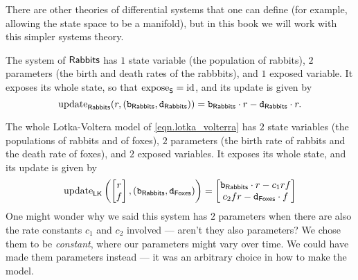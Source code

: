 \documentclass[DynamicalBook]{subfiles}
\begin{document}
\begin{remark}
  There are other theories of differential systems that one can define (for
  example, allowing the state space to be a manifold), but in this book we will
  work with this simpler systems theory.
\end{remark}

\begin{example}\label{ex:lotka.volterra.model}
  The system of $\mathsf{Rabbits}$ has $1$ state variable (the population of
  rabbits), $2$ parameters (the birth and death rates of the rabbbits), and $1$ exposed
  variable. It exposes its whole state, so that $\mathrm{expose}_{\mathsf{S}} = \mathrm{id}$, and its
  update is given by
  \[
\mathrm{update}_{\mathsf{\mathsf{Rabbits}}}( {r, (\mathtt{b}_{\mathsf{Rabbits}}, \mathtt{d}_{\mathsf{Rabbits}})} )
= \mathtt{b}_{\mathsf{Rabbits}} \cdot r - \mathtt{d}_{\mathsf{Rabbits}} \cdot r.
\]

  The whole Lotka-Voltera model of \cref{eqn.lotka_volterra} has $2$ state
  variables (the populations of rabbits and of foxes), $2$ parameters (the birth rate of rabbits and the death rate of foxes), and $2$ exposed
  variables. It exposes its whole state, and its update is given by
  \[
\mathrm{update}_{\mathsf{LK}}\left(  \begin{bmatrix}r \\ f \end{bmatrix}, (\mathtt{b}_{\mathsf{Rabbits}}, \mathtt{d}_{\mathsf{Foxes}})\right)
= \begin{bmatrix} \mathtt{b}_{\mathsf{Rabbits}} \cdot r -  c_1 r f \\ c_2 f r -
  \mathtt{d}_{\mathsf{Foxes}} \cdot f \end{bmatrix}
  \]
  One might wonder why we said this system has $2$ parameters when there are
  also the rate constants $c_1$ and $c_2$ involved --- aren't they also
  parameters? We chose them to be \emph{constant}, where our parameters might
  vary over time. We could have made them parameters instead --- it was an arbitrary choice
  in how to make the model.
\end{example}
\end{document}
